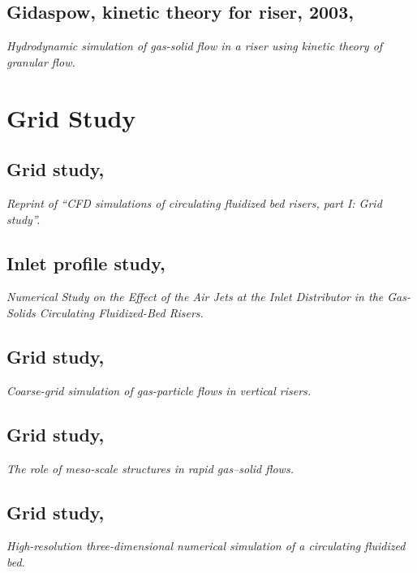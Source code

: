 \subsection[Gidaspow, kinetic theory for riser, 2003]{Gidaspow, kinetic theory for riser, 2003, \cite{Huilin2003}}
\textit{Hydrodynamic simulation of gas-solid flow in a riser using kinetic theory of granular flow.}

\section{Grid Study}
%
%
\subsection[Grid study, 2014]{Grid study, \cite{Li2014}}
\textit{Reprint of ``CFD simulations of circulating fluidized bed risers, part I: Grid study''.}

%
%
\subsection[Inlet profile study, 2010]{Inlet profile study, \cite{Peng2010}}
\textit{Numerical Study on the Effect of the Air Jets at the Inlet Distributor in the Gas-Solids Circulating Fluidized-Bed Risers.}

%
%
\subsection[Grid study, 2005]{Grid study, \cite{AndrewsIV2005}}
\textit{Coarse-grid simulation of gas-particle flows in vertical risers.}

%
%
\subsection[Grid study, 2001]{Grid study, \cite{Agrawal2001}}
\textit{The role of meso-scale structures in rapid gas–solid flows.}

%
%
\subsection[Grid study, 2001]{Grid study, \cite{Zhang2001}}
\textit{High-resolution three-dimensional numerical simulation of a circulating fluidized bed.}



